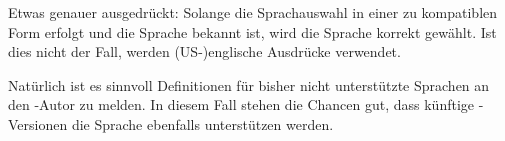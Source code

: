 \begin{Explain}
  Etwas genauer ausgedrückt: Solange die Sprachauswahl in einer zu
   kompatiblen Form erfolgt und die Sprache
   bekannt ist, wird die Sprache korrekt gewählt. Ist dies
  nicht der Fall, werden (US-)englische Ausdrücke verwendet.
\end{Explain}

Natürlich ist es sinnvoll Definitionen für bisher nicht unterstützte Sprachen
an den \KOMAScript-Autor zu melden. In diesem Fall stehen die Chancen gut,
dass künftige \KOMAScript-Versionen die Sprache ebenfalls unterstützen
werden.%
\EndIndexGroup
%
\EndIndexGroup




